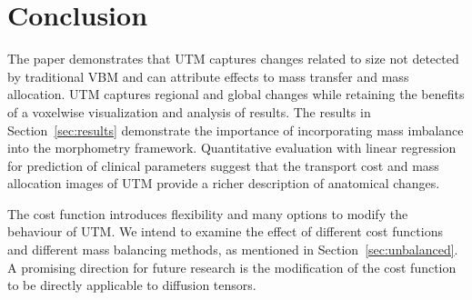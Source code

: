\documentclass{llncs}
\begin{document}
\section{Conclusion}
The paper demonstrates that UTM captures changes related to size not detected
by traditional VBM and can attribute effects to mass transfer and mass
allocation. UTM captures regional and global changes while retaining the
benefits of a voxelwise visualization and analysis of results.  The results in
Section~\ref{sec:results} demonstrate the importance of incorporating mass
imbalance into the morphometry framework.  Quantitative evaluation with linear
regression for prediction of clinical parameters suggest that the transport
cost and mass allocation images of UTM provide a richer description of
anatomical changes.

The cost function introduces flexibility and many options to modify the
behaviour of UTM. We intend to examine the effect of different cost functions
and different mass balancing methods, as mentioned in
Section~\ref{sec:unbalanced}.  A promising direction for future research is the
modification of the cost function to be directly applicable to diffusion
tensors.



\end{document}
